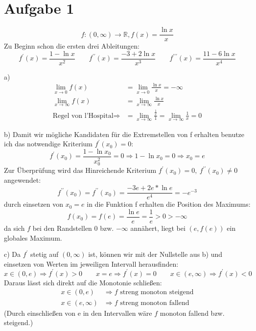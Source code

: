 \documentclass[a4paper]{article}
\newcommand{\limxzer}{\lim_{x \rightarrow 0}}
\begin{document}
\thispagestyle{fancy}

\section*{Aufgabe 1}
\[ f: (0,\infty) \rightarrow \mathbb{R}, f(x) = \frac{\ln x}{x} \]
Zu Beginn schon die ersten drei Ableitungen:
\[
	f^\prime (x) = \frac{1 - \ln x}{x^2} \qquad
	f^{\prime\prime} (x) =
	\frac{-3+2 \ln x}{x^3} \qquad
	f^{\prime\prime\prime} (x) =
	\frac{11 - 6 \ln x}{x^4}
	\]
\par{a)}
\begin{align*}
	\limxzer f(x) &= \limxzer \frac{\ln x}{x} = -\infty \\
	\lim_{x \rightarrow \infty} f(x) &= \lim_{x \rightarrow \infty} \frac{\ln x}{x} \\
	\text{Regel von l'Hospital} \Rightarrow &= \lim_{x \rightarrow \infty} \frac{\frac{1}{x}}{1} = \lim_{x \rightarrow \infty} \frac{1}{x} = 0
\end{align*}

\par{b)}
Damit wir mögliche Kandidaten für die Extremstellen von f erhalten benutze ich das notwendige Kriterium $f^\prime(x_0) = 0$:
\[ 
	f^\prime (x_0) = \frac{1-\ln x_0}{x_0^2} = 0 \Rightarrow 1-\ln x_0 =0
	\Rightarrow x_0 = e
\]
Zur Überprüfung wird das Hinreichende Kriterium $f^\prime (x_0) = 0, \ f^{\prime\prime}(x_0) \neq 0$ angewendet:
\[
	f^{\prime\prime} (x_0) = f^{\prime\prime} (x_0) = \frac{-3e + 2e*\ln e}{e^4} = -e^{-3}
	\]
durch einsetzen von $x_0 = e$ in die Funktion f erhalten die Position des Maximums:
\[
	f(x_0) = f(e) = \frac{\ln e}{e} = \frac{1}{e} > 0 > -\infty
	\]
da sich $f$ bei den Randstellen 0 bzw. $-\infty$ annähert, liegt bei $(e,f(e))$ ein globales Maximum.

\vspace{1cm}

\par{c)} Da $f^\prime$ stetig auf $(0,\infty)$ ist, können wir mit der Nullstelle aus b) und einsetzen von Werten im jeweiligen Intervall herausfinden:
\[
	x \in (0,e) \Rightarrow f^\prime(x) > 0 \qquad
	x = e \Rightarrow f^\prime(x) = 0 \qquad
	x \in (e,\infty) \Rightarrow f^\prime(x) < 0
\]
Daraus lässt sich direkt auf die Monotonie schließen:
\begin{align*}
	x \in (0,e) &\Rightarrow f \text{ streng monoton steigend} \\
	x \in (e,\infty) &\Rightarrow f \text{ streng monoton fallend}
\end{align*}
(Durch einschließen von e in den Intervallen wäre $f$ monoton fallend bzw. steigend.)
\end{document}

